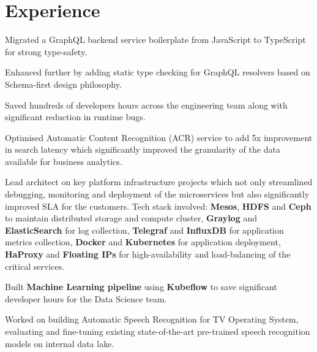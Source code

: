 \documentclass[]{deedy-resume-openfont}
\begin{document}
\hfill
\begin{minipage}[t]{0.66\textwidth} 


\section{Experience}
\vspace{\topsep}
\begin{tightemize}
\item Migrated a GraphQL backend service boilerplate from JavaScript to TypeScript for strong type-safety.
\item Enhanced further by adding static type checking for GraphQL resolvers based on Schema-first design philosophy.
\item Saved hundreds of developers hours across the engineering team along with significant reduction in runtime bugs.
\end{tightemize}
\sectionsep

\begin{tightemize}
\item Optimised Automatic Content Recognition (ACR) service to add 5x improvement in search latency which significantly improved the granularity of the data available for business analytics.
\item Lead architect on key platform infrastructure projects which not only streamlined debugging, monitoring and deployment of the microservices but also significantly improved SLA for the customers. Tech stack involved: \textbf{Mesos}, \textbf{HDFS} and \textbf{Ceph} to maintain distributed storage and compute cluster, \textbf{Graylog} and \textbf{ElasticSearch} for log collection, \textbf{Telegraf} and \textbf{InfluxDB} for application metrics collection, \textbf{Docker} and \textbf{Kubernetes} for application deployment, \textbf{HaProxy} and \textbf{Floating IPs} for high-availability and load-balancing of the critical services.
\item Built \textbf{Machine Learning pipeline} using \textbf{Kubeflow} to save significant developer hours for the Data Science team.
\item Worked on building Automatic Speech Recognition for TV Operating System, evaluating and fine-tuning existing state-of-the-art pre-trained speech recognition models on internal data lake.
\end{tightemize}
\sectionsep


\end{minipage}
\end{document}
